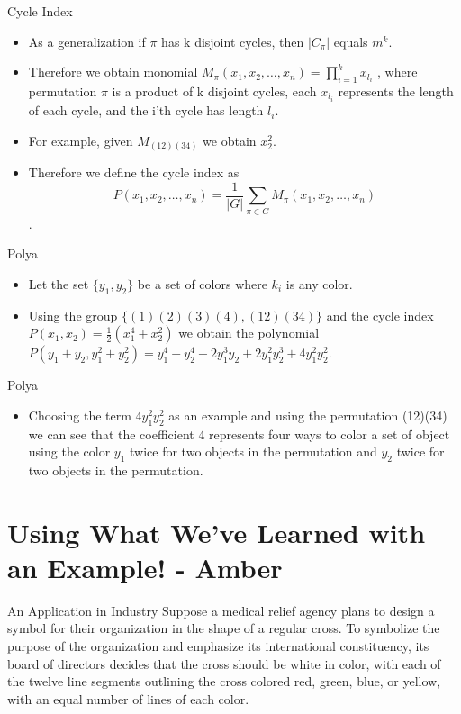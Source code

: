 \documentclass{beamer}
\begin{document}
%
%
\begin{frame}{Cycle Index}
\begin{itemize}
\item As a generalization if $\pi$ has k disjoint cycles, then $\vert C_{\pi}\vert$ equals $m^k$.
\item Therefore we obtain monomial $M_{\pi}(x_{1}, x_{2}, \ldots,x_{n}) = \displaystyle \prod_{i=1}^{k}x_{l_{i}}$ , where permutation $\pi$ is a product of k disjoint cycles, each $x_{l_{i}}$ represents the length of each cycle, and the i'th cycle has length $l_{i}$.
\item For example, given $M_{(12)(34)}$ we obtain $x_{2}^{2}$.
\item Therefore we define the cycle index as $$P(x_{1}, x_{2}, \ldots,x_{n})=\frac{1}{|G|}\sum_{\pi\in G}M_{\pi}(x_{1}, x_{2}, \ldots,x_{n})$$.
\end{itemize}
\end{frame}

%
%
\begin{frame}{Polya}
\begin{itemize}
\item Let the set $\{y_{1}, y_{2}\}$ be a set of colors where $k_{i}$ is any color.
\item Using the group $\{(1)(2)(3)(4), (12)(34)\}$ and the cycle index $P(x_{1},x_{2}) = \frac{1}{2}(x_{1}^{4} + x_{2}^{2})$ we obtain the polynomial $P(y_{1}+y_{2} , y_{1}^{2}+y_{2}^{2}) = y_{1}^{4} + y_{2}^{4} + 2y_{1}^{3}y_{2} + 2y_{1}^{2}y_{2}^{3} + 4y_{1}^{2}y_{2}^{2}$.
\end{itemize}
\end{frame}

%
%
\begin{frame}{Polya}
\begin{itemize}
\item Choosing the term $4y_{1}^{2}y_{2}^{2}$ as an example and using the permutation (12)(34) we can see that the coefficient 4 represents four ways to color a set of object using the color $y_{1}$ twice for two objects in the permutation and $y_{2}$ twice for two objects in the permutation.
\end{itemize}
\end{frame}
\section{Using What We've Learned with an Example! - Amber}

\begin{frame}{An Application in Industry}
	Suppose a medical relief agency plans to design a symbol for their organization in the shape of a regular cross. To symbolize the purpose of the organization and emphasize its international constituency, its board of directors decides that the cross should be white in color, with each of the twelve line segments outlining the cross colored red, green, blue, or yellow, with an equal number of lines of each color.
\end{frame}
\end{document}
